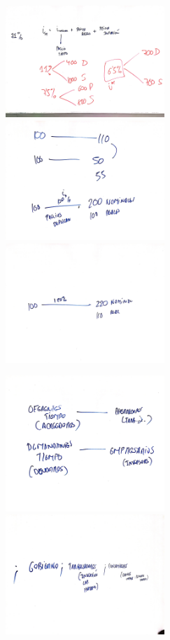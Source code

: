 \begin{figure}[htbp]
    \centering
    \includegraphics[width=6cm]{Classes/Images/2019-09-04-02.JPG}
    \includegraphics[width=6cm]{Classes/Images/2019-09-04-03.JPG}
    \includegraphics[width=6cm]{Classes/Images/2019-09-04-04.JPG}
    \caption{}
    \label{}
\end{figure} 

\begin{figure}[htbp]
    \centering
    \includegraphics[width=6cm]{Classes/Images/2019-09-04-05.JPG}
    \includegraphics[width=6cm]{Classes/Images/2019-09-04-06.JPG}
    \caption{}
    \label{}
\end{figure} 


